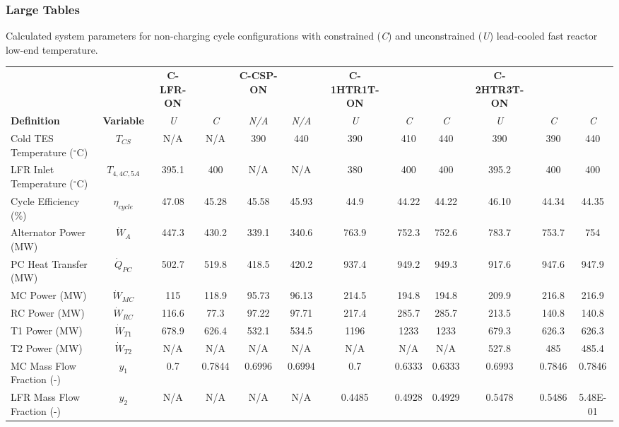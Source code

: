 \begin{paracol}{2}
\subsubsection{Large Tables}
\begin{specialtable}[H] 
    \caption{Calculated system parameters for non-charging cycle configurations with constrained (\textit{C}) and unconstrained (\textit{U}) lead-cooled fast reactor low-end temperature.\label{tab-noncharg}}
    \begin{tabular}{lccccccccccc}
    \toprule
     &  & \textbf{C-LFR-ON} & & \textbf{C-CSP-ON} &  &	\textbf{C-1HTR1T-ON} &	&	&	\textbf{C-2HTR3T-ON}	&	& \\
    \textbf{Definition} & \textbf{Variable} & \textit{U} & \textit{C} & \textit{N/A} & \textit{N/A} &	\textit{U}	&	\textit{C}	&	\textit{C}	&	\textit{U}	&	\textit{C}	&	\textit{C}
    \\
    \midrule
    Cold TES Temperature ($^{\circ}$C)	&	$T_{CS}$	&	N/A	&	N/A	&	390	&	440	&	390	&	410	&	440	&	390	&	390	&	440	\\
    LFR Inlet Temperature ($^{\circ}$C)	&	$T_{4,4C,5A}$	&	395.1	&	400	&	N/A	&	N/A	&	380	&	400	&	400	&	395.2	&	400	&	400	\\
    Cycle Efficiency (\%)	&	$\eta_{cycle}$	&	47.08	&	45.28	&	45.58	&	45.93	&	44.9	&	44.22	&	44.22	&	46.10	&	44.34	&	44.35	\\
    Alternator Power (MW)	&	$\dot{W}_{A}$	&	447.3	&	430.2	&	339.1	&	340.6	&	763.9	&	752.3	&	752.6	&	783.7	&	753.7	&	754	\\
    PC Heat Transfer (MW)	&	$\dot{Q}_{PC}$	&	502.7	&	519.8	&	418.5	&	420.2	&	937.4	&	949.2	&	949.3	&	917.6	&	947.6	&	947.9	\\
    MC Power (MW)	&	$\dot{W}_{MC}$	&	115	&	118.9	&	95.73	&	96.13	&	214.5	&	194.8	&	194.8	&	209.9	&	216.8	&	216.9	\\
    RC Power (MW)	&	$\dot{W}_{RC}$	&	116.6	&	77.3	&	97.22	&	97.71	&	217.4	&	285.7	&	285.7	&	213.5	&	140.8	&	140.8	\\
    T1 Power (MW)	&	$\dot{W}_{T1}$	&	678.9	&	626.4	&	532.1	&	534.5	&	1196	&	1233	&	1233	&	679.3	&	626.3	&	626.3	\\
    T2 Power (MW)	&	$\dot{W}_{T2}$	&	N/A	&	N/A	&	N/A	&	N/A	&	N/A	&	N/A	&	N/A	&	527.8	&	485	&	485.4	\\
    MC Mass Flow Fraction (-)	&	$y_{1}$	&	0.7	&	0.7844	&	0.6996	&	0.6994	&	0.7	&	0.6333	&	0.6333	&	0.6993	&	0.7846	&	0.7846	\\
    LFR Mass Flow Fraction (-)	&	$y_{2}$	&	N/A	&	N/A	&	N/A	&	N/A	&	0.4485	&	0.4928	&	0.4929	&	0.5478	&	0.5486	&	5.48E-01	\\

\end{tabular}
\end{specialtable}
\end{paracol}
